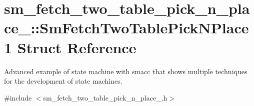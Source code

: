 \hypertarget{structsm__fetch__two__table__pick__n__place__1_1_1SmFetchTwoTablePickNPlace1}{}\section{sm\+\_\+fetch\+\_\+two\+\_\+table\+\_\+pick\+\_\+n\+\_\+place\+\_\+:\+:Sm\+Fetch\+Two\+Table\+Pick\+N\+Place1 Struct Reference}
\label{structsm__fetch__two__table__pick__n__place__1_1_1SmFetchTwoTablePickNPlace1}


Advanced example of state machine with smacc that shows multiple techniques for the development of state machines.  




{\ttfamily \#include $<$sm\+\_\+fetch\+\_\+two\+\_\+table\+\_\+pick\+\_\+n\+\_\+place\+\_.\+h$>$}



